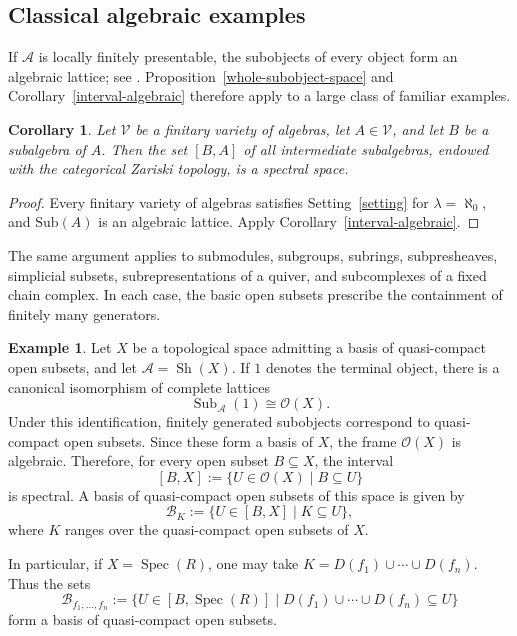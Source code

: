 \documentclass{amsproc}
\theoremstyle{definition}
\newtheorem{example}[theorem]{Example}
\theoremstyle{plain}
\newtheorem{corollary}[theorem]{Corollary}
\theoremstyle{remark}
\numberwithin{equation}{section}
\newcommand{\Cal}[1]{{\mathcal #1}}
\newcommand{\Spec}{\operatorname{Spec}}
\newcommand{\sub}[1]{\mathrm{Sub} (#1)}
\newcommand{\Sh}{\operatorname{Sh}}
\begin{document}
\subsection{Classical algebraic examples}

If $\mathscr A$ is locally finitely presentable, the subobjects of every object form an algebraic lattice; see \cite[Theorem~5]{Porst2011}. Proposition~\ref{whole-subobject-space} and Corollary~\ref{interval-algebraic} therefore apply to a large class of familiar examples.

\begin{corollary}\label{variety-example}
Let $\Cal V$ be a finitary variety of algebras, let $A\in\Cal V$, and let $B$ be a subalgebra of $A$. Then the set $[B,A]$ of all intermediate subalgebras, endowed with the categorical Zariski topology, is a spectral space.
\end{corollary}

\begin{proof}
Every finitary variety of algebras satisfies Setting~\ref{setting} for $\lambda=\aleph_0$, and $\sub A$ is an algebraic lattice. Apply Corollary~\ref{interval-algebraic}.
\end{proof}

The same argument applies to submodules, subgroups, subrings, subpresheaves, simplicial subsets, subrepresentations of a quiver, and subcomplexes of a fixed chain complex. In each case, the basic open subsets prescribe the containment of finitely many generators.

\begin{example}\label{sheaves-algebraic}
Let $X$ be a topological space admitting a basis of quasi-compact open subsets, and let $\mathscr A=\Sh(X)$. If $1$ denotes the terminal object, there is a canonical isomorphism of complete lattices
$$
\operatorname{Sub}_{\mathscr A}(1)\cong\Cal O(X).
$$
Under this identification, finitely generated subobjects correspond to quasi-compact open subsets. Since these form a basis of $X$, the frame $\Cal O(X)$ is algebraic. Therefore, for every open subset $B\subseteq X$, the interval
$$
[B,X]:=\{U\in\Cal O(X)\mid B\subseteq U\}
$$
is spectral. A basis of quasi-compact open subsets of this space is given by
$$
\Cal B_K:=\{U\in[B,X]\mid K\subseteq U\},
$$
where $K$ ranges over the quasi-compact open subsets of $X$.

In particular, if $X=\Spec(R)$, one may take $K=D(f_1)\cup\cdots\cup D(f_n)$. Thus the sets
$$
\Cal B_{f_1,\ldots,f_n}
:=
\{U\in[B,\Spec(R)]\mid D(f_1)\cup\cdots\cup D(f_n)\subseteq U\}
$$
form a basis of quasi-compact open subsets.
\end{example}
\end{document}
